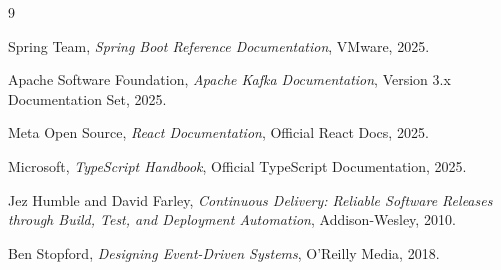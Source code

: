 \begin{thebibliography}{9}


Spring Team,
\textit{Spring Boot Reference Documentation},
VMware, 2025.

Apache Software Foundation,
\textit{Apache Kafka Documentation},
Version 3.x Documentation Set, 2025.

Meta Open Source,
\textit{React Documentation},
Official React Docs, 2025.

Microsoft,
\textit{TypeScript Handbook},
Official TypeScript Documentation, 2025.

Jez Humble and David Farley,
\textit{Continuous Delivery: Reliable Software Releases through Build, Test, and Deployment Automation},
Addison-Wesley, 2010.

Ben Stopford,
\textit{Designing Event-Driven Systems},
O'Reilly Media, 2018.

\end{thebibliography}